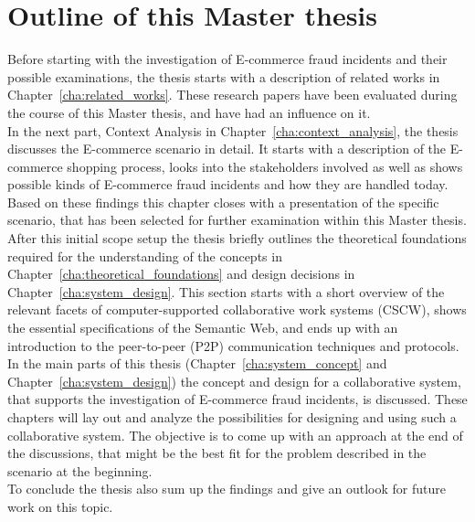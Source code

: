 
\section{Outline of this Master thesis}
\label{sec:thesis_outline}

Before starting with the investigation of \gls{E-commerce} fraud incidents and their possible examinations, the thesis starts with a description of related works in Chapter~\ref{cha:related_works}. These research papers have been evaluated during the course of this Master thesis, and have had an influence on it. \\

In the next part, Context Analysis in Chapter~\ref{cha:context_analysis}, the thesis discusses the \gls{E-commerce} scenario in detail. It starts with a description of the \gls{E-commerce} shopping process, looks into the stakeholders involved as well as shows possible kinds of \gls{E-commerce} fraud incidents and how they are handled today. Based on these findings this chapter closes with a presentation of the specific scenario, that has been selected for further examination within this Master thesis. \\

After this initial scope setup the thesis briefly outlines the theoretical foundations required for the understanding of the concepts in Chapter~\ref{cha:theoretical_foundations} and design decisions in Chapter~\ref{cha:system_design}. This section starts with a short overview of the relevant facets of computer-supported collaborative work systems (\gls{CSCW}), shows the essential specifications of the Semantic Web, and ends up with an introduction to the peer-to-peer (\gls{P2P}) communication techniques and protocols. \\

In the main parts of this thesis (Chapter~\ref{cha:system_concept} and Chapter~\ref{cha:system_design}) the concept and design for a collaborative system, that supports the investigation of \gls{E-commerce} fraud incidents, is discussed. These chapters will lay out and analyze the possibilities for designing and using such a collaborative system. The objective is to come up with an approach at the end of the discussions, that might be the best fit for the problem described in the scenario at the beginning. \\

To conclude the thesis also sum up the findings and give an outlook for future work on this topic.

